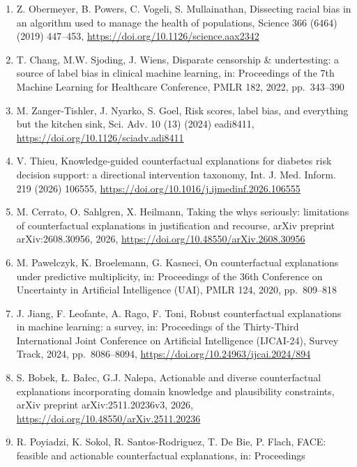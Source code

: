 \documentclass[
  11pt,
]{article}
\begin{document}
\begin{enumerate}
  Pereira, T.F. Galvao, Accuracy of self-reported hypertension: a
  systematic review and meta-analysis, J. Hypertens. 36 (5) (2018)
  970--978, \url{https://doi.org/10.1097/HJH.0000000000001648}
\item
  Z. Obermeyer, B. Powers, C. Vogeli, S. Mullainathan, Dissecting racial
  bias in an algorithm used to manage the health of populations, Science
  366 (6464) (2019) 447--453,
  \url{https://doi.org/10.1126/science.aax2342}
\item
  T. Chang, M.W. Sjoding, J. Wiens, Disparate censorship \&
  undertesting: a source of label bias in clinical machine learning, in:
  Proceedings of the 7th Machine Learning for Healthcare Conference,
  PMLR 182, 2022, pp.~343--390
\item
  M. Zanger-Tishler, J. Nyarko, S. Goel, Risk scores, label bias, and
  everything but the kitchen sink, Sci. Adv. 10 (13) (2024) eadi8411,
  \url{https://doi.org/10.1126/sciadv.adi8411}
\item
  V. Thieu, Knowledge-guided counterfactual explanations for diabetes
  risk decision support: a directional intervention taxonomy, Int. J.
  Med. Inform. 219 (2026) 106555,
  \url{https://doi.org/10.1016/j.ijmedinf.2026.106555}
\item
  M. Cerrato, O. Sahlgren, X. Heilmann, Taking the whys seriously:
  limitations of counterfactual explanations in justification and
  recourse, arXiv preprint arXiv:2608.30956, 2026,
  \url{https://doi.org/10.48550/arXiv.2608.30956}
\item
  M. Pawelczyk, K. Broelemann, G. Kasneci, On counterfactual
  explanations under predictive multiplicity, in: Proceedings of the
  36th Conference on Uncertainty in Artificial Intelligence (UAI), PMLR
  124, 2020, pp.~809--818
\item
  J. Jiang, F. Leofante, A. Rago, F. Toni, Robust counterfactual
  explanations in machine learning: a survey, in: Proceedings of the
  Thirty-Third International Joint Conference on Artificial Intelligence
  (IJCAI-24), Survey Track, 2024, pp.~8086--8094,
  \url{https://doi.org/10.24963/ijcai.2024/894}
\item
  S. Bobek, Ł. Bałec, G.J. Nalepa, Actionable and diverse counterfactual
  explanations incorporating domain knowledge and plausibility
  constraints, arXiv preprint arXiv:2511.20236v3, 2026,
  \url{https://doi.org/10.48550/arXiv.2511.20236}
\item
  R. Poyiadzi, K. Sokol, R. Santos-Rodriguez, T. De Bie, P. Flach, FACE:
  feasible and actionable counterfactual explanations, in: Proceedings

\end{enumerate}
\end{document}
